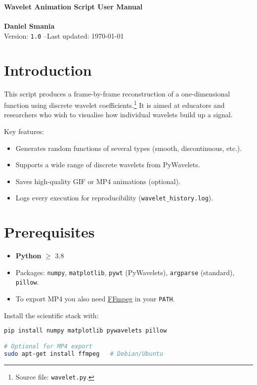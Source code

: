 \documentclass[12pt]{article}
\begin{document}
\begin{center}
{\LARGE\bfseries Wavelet Animation Script User Manual}\\ \ \\  { \LARGE\bfseries Daniel Smania} \\[0.5em]
Version: \texttt{1.0} \quad--\quad Last updated: \today \\

\end{center}
\vspace{1em}

\tableofcontents
\newpage

\section{Introduction}
This script produces a frame-by-frame reconstruction of a one-dimensional function using discrete wavelet coefficients.\footnote{Source file: \texttt{wavelet.py}.} It is aimed at educators and researchers who wish to visualise how individual wavelets build up a signal.

Key features:
\begin{itemize}[nosep]
  \item Generates random functions of several types (smooth, discontinuous, etc.).
  \item Supports a wide range of discrete wavelets from PyWavelets.
  \item Saves high-quality GIF or MP4 animations (optional).
  \item Logs every execution for reproducibility (\texttt{wavelet\_history.log}).
\end{itemize}

\section{Prerequisites}
\begin{itemize}[nosep]
  \item \textbf{Python} $\ge$ 3.8
  \item Packages: \texttt{numpy}, \texttt{matplotlib}, \texttt{pywt} (PyWavelets), \texttt{argparse} (standard), \texttt{pillow}.
  \item To export MP4 you also need \href{https://ffmpeg.org/}{FFmpeg} in your \texttt{PATH}.
\end{itemize}

Install the scientific stack with:
\begin{lstlisting}[language=bash]
pip install numpy matplotlib pywavelets pillow

# Optional for MP4 export
sudo apt-get install ffmpeg   # Debian/Ubuntu
\end{lstlisting}
\end{document}
